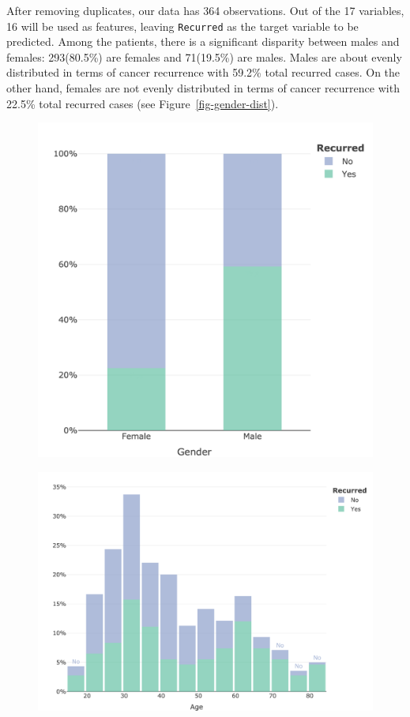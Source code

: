 \documentclass[
  letterpaper,
  DIV=11,
  numbers=noendperiod]{scrartcl}
\begin{document}
After removing duplicates, our data has 364 observations. Out of the 17
variables, 16 will be used as features, leaving \texttt{Recurred} as the
target variable to be predicted. Among the patients, there is a
significant disparity between males and females: 293(80.5\%) are females
and 71(19.5\%) are males. Males are about evenly distributed in terms of
cancer recurrence with 59.2\% total recurred cases. On the other hand,
females are not evenly distributed in terms of cancer recurrence with
22.5\% total recurred cases (see Figure~\ref{fig-gender-dist}).



\begin{figure}
	\centering
	\begin{minipage}{.5\textwidth}
			\centering
			\includegraphics[width=0.75\linewidth]{images/gender_dist_plot.png}
			\label{fig-gender-dist}
		\end{minipage}%
	\begin{minipage}{.5\textwidth}
			\centering
			\includegraphics[width=1\linewidth]{images/age_dist_plot.png}
			\label{fig-age-dist}
		\end{minipage}
\end{figure}
\end{document}
